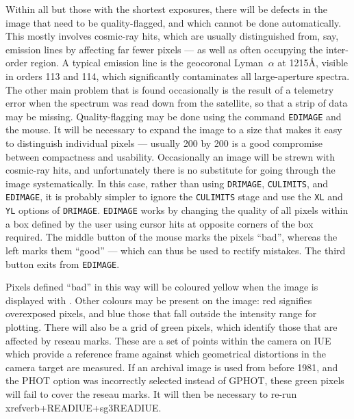 \begin{htmlonly}
Within all but those with the shortest exposures, there will be defects in the
image that need to be quality-flagged, and which cannot be done automatically. 
This mostly involves cosmic-ray hits, which are usually distinguished from,
say, emission lines by affecting far fewer pixels --- as well as often
occupying the inter-order region.  A typical emission line is the geocoronal
Lyman~$\alpha$ at 1215{\AA}, visible in orders 113 and 114, which significantly
contaminates all large-aperture spectra. The other main problem that is found
occasionally is the result of a telemetry error when the spectrum was read down
from the satellite, so that a strip of data may be missing.  Quality-flagging
may be done using the command
\verb+EDIMAGE+ and the mouse.  It will be necessary to expand the image to a
size that makes it easy to distinguish individual pixels --- usually 200 by 200
is a good compromise between compactness and usability. Occasionally an image
will be strewn with cosmic-ray hits, and unfortunately there is no substitute
for going through the image systematically.  In this case, rather than using
\verb+DRIMAGE+,
\verb+CULIMITS+, and \verb+EDIMAGE+, it is probably simpler to ignore the
\verb+CULIMITS+ stage and use the
\verb+XL+ and \verb+YL+ options of \verb+DRIMAGE+\@. \verb+EDIMAGE+ works by
changing the quality of all pixels within a box defined by the user using
cursor hits at opposite corners of the box required.  The middle button of the
mouse marks the pixels ``bad'', whereas the left marks them ``good'' --- which
can thus be used to rectify mistakes.  The third button exits from
\verb+EDIMAGE+\@.
\end{htmlonly}

Pixels defined ``bad'' in this way will be coloured yellow when the image is
displayed with \@. Other colours may be 
present on the image:
red signifies overexposed pixels, and blue those that fall outside the
intensity range for plotting. There will also be a grid of green pixels, which
identify those that are affected by reseau marks.  These are a set of points
within the camera on IUE which provide a reference frame against which
geometrical distortions in the camera target are measured.  If an archival
image is used from before 1981, and the PHOT option was incorrectly
selected instead of GPHOT, these green pixels will fail to cover the
reseau marks.  It will then be necessary to re-run
\\xref{verb+READIUE+}{sg3}{READIUE}\@.

